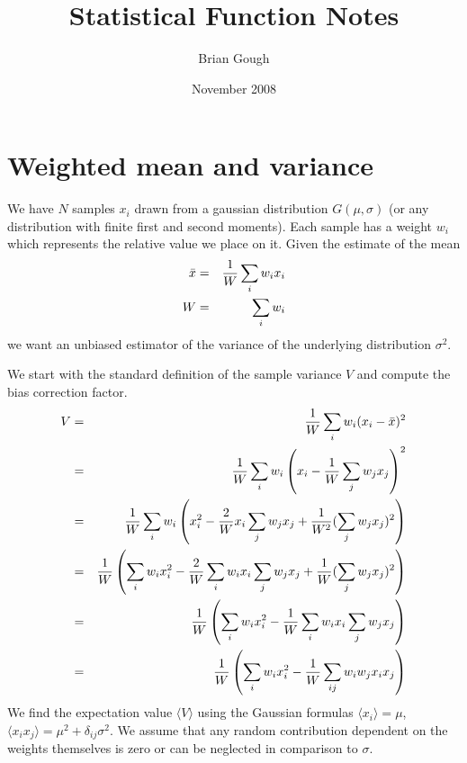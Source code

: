 \documentclass[fleqn,12pt]{article}
\newcommand{\expectation}[1]{\langle #1 \rangle}
\begin{document}
\title{Statistical Function Notes}
\author{Brian Gough}
\date{November 2008}
\maketitle

\section{Weighted mean and variance}
We have $N$ samples $x_i$ drawn from a gaussian distribution
$G(\mu,\sigma)$ (or any distribution with finite first and second
moments).  Each sample has a weight $w_i$ which represents the
relative value we place on it.  Given the estimate of the mean
%
\begin{eqnarray}
\bar{x} &=& {1 \over W} \sum_i w_i x_i \\
W       &=& \sum_i w_i
\end{eqnarray}
%
\noindent
we want an unbiased estimator of the variance of the underlying
distribution $\sigma^2$.  

We start with the standard definition of the sample variance $V$ and
compute the bias correction factor.
%
\begin{eqnarray}
V &=& {1\over W} \sum_i w_i (x_i - \bar{x})^2 \\
  &=& {1\over W} \sum_i w_i \left(x_i - {1\over W}\sum_j w_j x_j\right)^2 \\
  &=& {1\over W} \sum_i w_i \left(x_i^2 - {2 \over W} x_i \sum_j w_j x_j 
       + {1 \over W^2} (\sum_j w_j x_j)^2\right) \\
  &=& {1\over W} \left( \sum_i w_i x_i^2 
       - {2 \over W} \sum_i w_i x_i \sum_j w_j x_j
       + {1 \over W} (\sum_j w_j x_j)^2\right)\\
  &=& {1\over W} \left( \sum_i w_i x_i^2 
       - {1 \over W} \sum_i w_i x_i \sum_j w_j x_j\right)\\
  &=& {1\over W} \left( \sum_i w_i x_i^2 
       - {1 \over W} \sum_{ij} w_i w_j x_i x_j\right)
\end{eqnarray}
%
We find the expectation value $\expectation{V}$ using the Gaussian
formulas $\expectation{x_i} = \mu$, $\expectation{x_i x_j} = \mu^2 +
\delta_{ij} \sigma^2$.  We assume that any random contribution
dependent on the weights themselves is zero or can be
neglected in comparison to $\sigma$.
\end{document}

